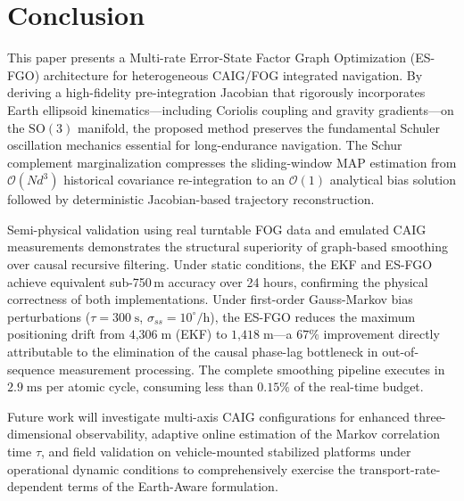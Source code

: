 \documentclass[journal]{IEEEtran}
\newcommand{\SO}{\mathrm{SO}}
\begin{document}
	\section{Conclusion}
	This paper presents a Multi-rate Error-State Factor Graph Optimization (ES-FGO) architecture for heterogeneous CAIG/FOG integrated navigation. By deriving a high-fidelity pre-integration Jacobian that rigorously incorporates Earth ellipsoid kinematics---including Coriolis coupling and gravity gradients---on the $\SO(3)$ manifold, the proposed method preserves the fundamental Schuler oscillation mechanics essential for long-endurance navigation. The Schur complement marginalization compresses the sliding-window MAP estimation from $\mathcal{O}(N d^3)$ historical covariance re-integration to an $\mathcal{O}(1)$ analytical bias solution followed by deterministic Jacobian-based trajectory reconstruction.
	
	Semi-physical validation using real turntable FOG data and emulated CAIG measurements demonstrates the structural superiority of graph-based smoothing over causal recursive filtering. Under static conditions, the EKF and ES-FGO achieve equivalent sub-750\,m accuracy over 24 hours, confirming the physical correctness of both implementations. Under first-order Gauss-Markov bias perturbations ($\tau = 300\;\text{s}$, $\sigma_{ss} = 10^\circ/\text{h}$), the ES-FGO reduces the maximum positioning drift from $4\text{,}306\;\text{m}$ (EKF) to $1\text{,}418\;\text{m}$---a $67\%$ improvement directly attributable to the elimination of the causal phase-lag bottleneck in out-of-sequence measurement processing. The complete smoothing pipeline executes in $2.9\;\text{ms}$ per atomic cycle, consuming less than $0.15\%$ of the real-time budget.
	
	Future work will investigate multi-axis CAIG configurations for enhanced three-dimensional observability, adaptive online estimation of the Markov correlation time $\tau$, and field validation on vehicle-mounted stabilized platforms under operational dynamic conditions to comprehensively exercise the transport-rate-dependent terms of the Earth-Aware formulation.
	
\end{document}
